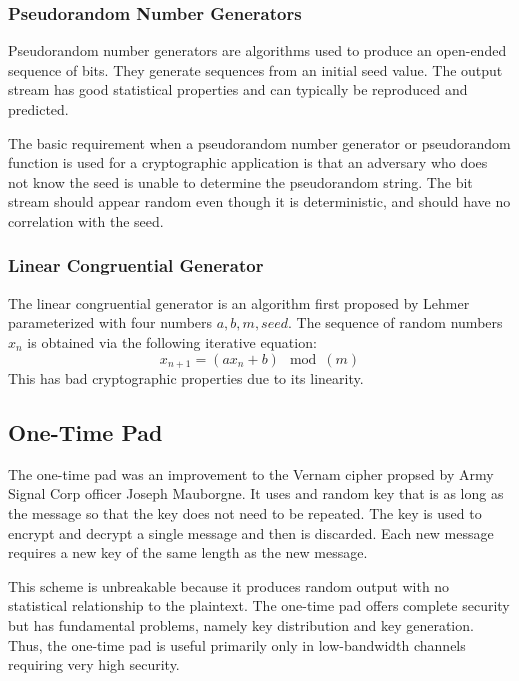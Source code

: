 \documentclass{math}
\begin{document}
\subsubsection*{Pseudorandom Number Generators}
Pseudorandom number generators are algorithms used to produce an open-ended
sequence of bits. They generate sequences from an initial seed value. The output
stream has good statistical properties and can typically be reproduced and
predicted.
\par The basic requirement when a pseudorandom number generator or pseudorandom
function is used for a cryptographic application is that an adversary who does
not know the seed is unable to determine the pseudorandom string. The bit stream
should appear random even though it is deterministic, and should have no
correlation with the seed.

\subsubsection*{Linear Congruential Generator}
The linear congruential generator is an algorithm first proposed by Lehmer
parameterized with four numbers \( a,b,m,seed \). The sequence of random
numbers \( x_n \) is obtained via the following iterative equation:
\[ x_{n+1} = (ax_n+b)\mod(m) \]
This has bad cryptographic properties due to its linearity.

\subsection*{One-Time Pad}
The one-time pad was an improvement to the Vernam cipher propsed by Army
Signal Corp officer Joseph Mauborgne. It uses and random key that is as long
as the message so that the key does not need to be repeated. The key is used
to encrypt and decrypt a single message and then is discarded. Each new message
requires a new key of the same length as the new message.
\par This scheme is unbreakable because it produces random output with no
statistical relationship to the plaintext. The one-time pad offers complete
security but has fundamental problems, namely key distribution and key
generation. Thus, the one-time pad is useful primarily only in low-bandwidth
channels requiring very high security.
\end{document}
